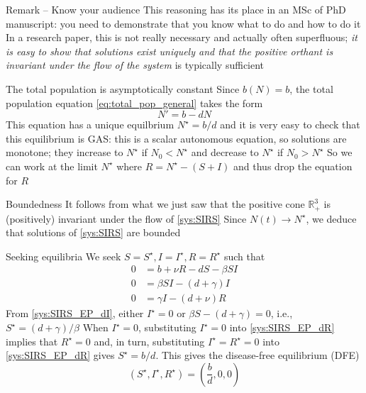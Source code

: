 \documentclass[aspectratio=43]{beamer}
\begin{document}
\begin{frame}{Remark -- Know your audience} 
This reasoning has its place in an MSc of PhD manuscript: you need to demonstrate that you know what to do and how to do it
\vfill
In a research paper, this is not really necessary and actually often superfluous; \emph{it is easy to show that solutions exist uniquely and that the positive orthant is invariant under the flow of the system} is typically sufficient
\end{frame}


\begin{frame}{The total population is asymptotically constant}
Since $b(N)=b$, the total population equation \eqref{eq:total_pop_general} takes the form
\[
N' = b-dN
\]
This equation has a unique equilbrium $N^\star=b/d$ and it is very easy to check that this equilibrium is GAS: this is a scalar autonomous equation, so solutions are monotone; they increase to $N^\star$ if $N_0<N^\star$ and decrease to $N^\star$ if $N_0>N^\star$
\vfill
So we can work at the limit $N^\star$ where $R=N^\star-(S+I)$ and thus drop the equation for $R$
\end{frame}


\begin{frame}{Boundedness}
It follows from what we just saw that the positive cone $\mathbb{R}_+^3$ is (positively) invariant under the flow of \eqref{sys:SIRS}
\vfill
Since $N(t)\to N^\star$, we deduce that solutions of \eqref{sys:SIRS} are bounded
\end{frame}


\begin{frame}{Seeking equilibria}
We seek $S=S^\star, I=I^\star, R=R^\star$ such that
\begin{subequations} \label{sys:SIRS_EP}
\begin{align}
0 &= b+\nu R-dS-\beta SI \label{sys:SIRS_EP_dS} \\
0 &= \beta SI-(d+\gamma) I \label{sys:SIRS_EP_dI} \\
0 &= \gamma I-(d+\nu)R \label{sys:SIRS_EP_dR}
\end{align}    
\end{subequations}
\vfill
From \eqref{sys:SIRS_EP_dI}, either $I^\star=0$ or $\beta S-(d+\gamma)=0$, i.e., $S^\star=(d+\gamma)/\beta$
\vfill
When $I^\star=0$, substituting $I^\star=0$ into \eqref{sys:SIRS_EP_dR} implies that $R^\star=0$ and, in turn, substituting $I^\star=R^\star=0$ into \eqref{sys:SIRS_EP_dR} gives $S^\star=b/d$. This gives the disease-free equilibrium (DFE)
\begin{equation}\label{eq:SIRS_DFE}
(S^\star,I^\star,R^\star)=
\left(\frac bd, 0, 0\right)
\end{equation}
\end{frame}
\end{document}
